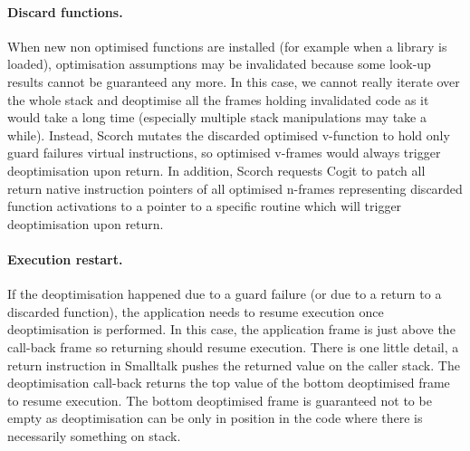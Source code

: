 \documentclass[a4paper,12pt,twoside]{../includes/ThesisStyle}
\begin{document}
\paragraph{Discard functions.} When new non optimised functions are installed (for example when a library is loaded), optimisation assumptions may be invalidated because some look-up results cannot be guaranteed any more. In this case, we cannot really iterate over the whole stack and deoptimise all the frames holding invalidated code as it would take a long time (especially multiple stack manipulations may take a while). Instead, Scorch mutates the discarded optimised v-function to hold only guard failures virtual instructions, so optimised v-frames would always trigger deoptimisation upon return. In addition, Scorch requests Cogit to patch all return native instruction pointers of all optimised n-frames representing discarded function activations to a pointer to a specific routine which will trigger deoptimisation upon return.

\paragraph{Execution restart.}

If the deoptimisation happened due to a guard failure (or due to a return to a discarded function), the application needs to resume execution once deoptimisation is performed. In this case, the application frame is just above the call-back frame so returning should resume execution. There is one little detail, a return instruction in Smalltalk pushes the returned value on the caller stack. The deoptimisation call-back returns the top value of the bottom deoptimised frame to resume execution. The bottom deoptimised frame is guaranteed not to be empty as deoptimisation can be only in position in the code where there is necessarily something on stack.






\ifx\wholebook\relax\else
    
\end{document}
